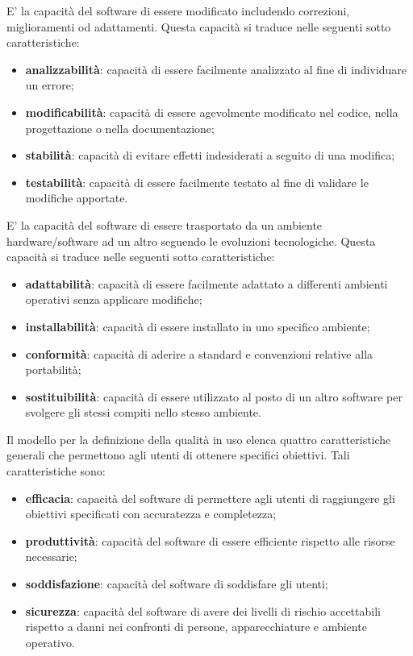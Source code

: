 	E' la capacità del software di essere modificato includendo correzioni, miglioramenti od adattamenti. Questa capacità si traduce nelle seguenti sotto caratteristiche:
	\begin{itemize}
		\item{\textbf{analizzabilità}: capacità di essere facilmente analizzato al fine di individuare un errore;}
		\item{\textbf{modificabilità}: capacità di essere agevolmente modificato nel codice, nella progettazione o nella documentazione;}
		\item{\textbf{stabilità}: capacità di evitare effetti indesiderati a seguito di una modifica;}
		\item{\textbf{testabilità}: capacità di essere facilmente testato al fine di validare le modifiche apportate.}
	\end{itemize}

	E' la capacità del software di essere trasportato da un ambiente hardware/software ad un altro seguendo le evoluzioni tecnologiche. Questa capacità si traduce nelle seguenti sotto caratteristiche:
	\begin{itemize}
		\item{\textbf{adattabilità}: capacità di essere facilmente adattato a differenti ambienti operativi senza applicare modifiche;}
		\item{\textbf{installabilità}: capacità di essere installato in uno specifico ambiente;}
		\item{\textbf{conformità}: capacità di aderire a standard e convenzioni relative alla portabilità;}
		\item{\textbf{sostituibilità}: capacità di essere utilizzato al posto di un altro software per svolgere gli stessi compiti nello stesso ambiente.}
	\end{itemize}
	
	Il modello per la definizione della qualità in uso elenca quattro caratteristiche generali che permettono agli utenti di ottenere specifici obiettivi. Tali caratteristiche sono:
	\begin{itemize}
		\item{\textbf{efficacia}: capacità del software di permettere agli utenti di raggiungere gli obiettivi specificati con accuratezza e completezza;}
		\item{\textbf{produttività}: capacità del software di essere efficiente rispetto alle risorse necessarie;}
		\item{\textbf{soddisfazione}: capacità del software di soddisfare gli utenti;}
		\item{\textbf{sicurezza}: capacità del software di avere dei livelli di rischio accettabili rispetto a danni nei confronti di persone, apparecchiature e ambiente operativo.}
	\end{itemize}
	
